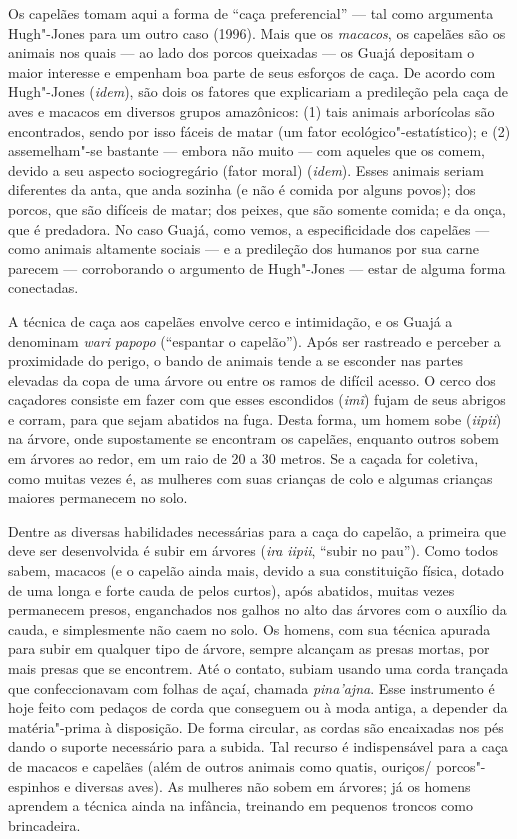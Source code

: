 Os capelães tomam aqui a forma de ``caça preferencial'' --- tal como
argumenta Hugh"-Jones para um outro caso (1996). Mais que os
\emph{macacos}, os capelães são os animais nos quais --- ao lado dos
porcos queixadas --- os Guajá depositam o maior interesse e empenham boa
parte de seus esforços de caça. De acordo com Hugh"-Jones (\emph{idem}), são
dois os fatores que explicariam a predileção pela caça de aves e macacos
em diversos grupos amazônicos: (1) tais animais arborícolas são
encontrados, sendo por isso fáceis de matar (um fator
ecológico"-estatístico); e (2) assemelham"-se bastante --- embora não muito
--- com aqueles que os comem, devido a seu aspecto sociogregário (fator
moral) (\emph{idem}). Esses animais seriam diferentes da anta, que anda sozinha
(e não é comida por alguns povos); dos porcos, que são difíceis de
matar; dos peixes, que são somente comida; e da onça, que é predadora.
No caso Guajá, como vemos, a especificidade dos capelães --- como animais
altamente sociais --- e a predileção dos humanos por sua carne parecem ---
corroborando o argumento de Hugh"-Jones --- estar de alguma forma
conectadas.

A técnica de caça aos capelães envolve cerco e intimidação, e os Guajá a
denominam \emph{wari} \emph{papopo} (``espantar o capelão''). Após ser
rastreado e perceber a proximidade do perigo, o bando de animais tende a
se esconder nas partes elevadas da copa de uma árvore ou entre os ramos
de difícil acesso. O cerco dos caçadores consiste em fazer com que esses
escondidos (\emph{imĩ}) fujam de seus abrigos e corram, para que sejam
abatidos na fuga. Desta forma, um homem sobe (\emph{iipii}) na árvore,
onde supostamente se encontram os capelães, enquanto outros sobem em
árvores ao redor, em um raio de 20 a 30 metros. Se a caçada for
coletiva, como muitas vezes é, as mulheres com suas crianças de colo e
algumas crianças maiores permanecem no solo.

Dentre as diversas habilidades necessárias para a caça do capelão, a
primeira que deve ser desenvolvida é subir em árvores (\emph{ira}
\emph{iipii}, ``subir no pau''). Como todos sabem, macacos (e o capelão
ainda mais, devido a sua constituição física, dotado de uma longa e
forte cauda de pelos curtos), após abatidos, muitas vezes permanecem
presos, enganchados nos galhos no alto das árvores com o auxílio da
cauda, e simplesmente não caem no solo. Os homens, com sua técnica
apurada para subir em qualquer tipo de árvore, sempre alcançam as presas
mortas, por mais presas que se encontrem. Até o contato, subiam usando
uma corda trançada que confeccionavam com folhas de açaí, chamada
\emph{pina'ajna}. Esse instrumento é hoje feito com pedaços de corda que
conseguem ou à moda antiga, a depender da matéria"-prima à disposição. De
forma circular, as cordas são encaixadas nos pés dando o suporte
necessário para a subida. Tal recurso é indispensável para a caça de
macacos e capelães (além de outros animais como quatis, ouriços/
porcos"-espinhos e diversas aves). As mulheres não sobem em árvores; já
os homens aprendem a técnica ainda na infância, treinando em pequenos
troncos como brincadeira.

